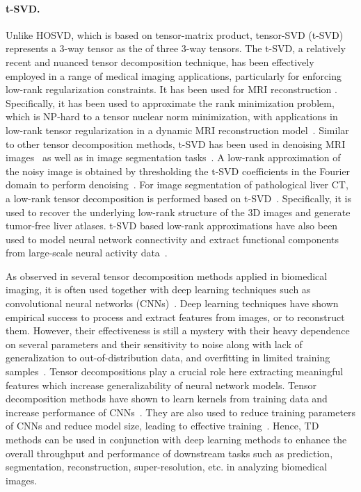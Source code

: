 \paragraph{t-SVD.}
    Unlike HOSVD, which is based on tensor-matrix product, tensor-SVD (t-SVD) represents a 3-way tensor as the  of three 3-way tensors. The t-SVD, a relatively recent and nuanced tensor decomposition technique, has been effectively employed in a range of medical imaging applications, particularly for enforcing low-rank regularization constraints. It has been used for MRI reconstruction \cite{jiang2020improved, liu2025dynamic, ai2018dynamic, liu2023low}. Specifically, it has been used to approximate the rank minimization problem, which is NP-hard to a tensor nuclear norm minimization, with applications in low-rank tensor regularization in a dynamic MRI reconstruction model~\cite{liu2025dynamic}. Similar to other tensor decomposition methods, t-SVD has been used in denoising MRI images~\cite{khaleel2018denoising, kong2017new, khaleel2018denoising2} as well as in image segmentation tasks~\cite{shi2021multi}. A low-rank approximation of the noisy image is obtained by thresholding the t-SVD coefficients in the Fourier domain to perform denoising~\cite{khaleel2018denoising2}. For image segmentation of pathological liver CT, a low-rank tensor decomposition is performed based on t-SVD~\cite{shi2021multi}. Specifically, it is used to recover the underlying low-rank structure of the 3D images and generate tumor-free liver atlases.  
    t-SVD based low-rank approximations have also been used to model neural network connectivity and extract functional components from large-scale neural activity data~\cite{williams2018unsupervised}. 


As observed in several tensor decomposition methods applied in biomedical imaging, it is often used together with deep learning techniques such as convolutional neural networks (CNNs)~\cite{yaman2019low,oymak2021learning, khan2022deep, li2023learned}. Deep learning techniques have shown empirical success to process and extract features from images, or to reconstruct them. However, their effectiveness is still a mystery with their heavy dependence on several parameters and their sensitivity to noise along with lack of generalization to out-of-distribution data, and overfitting in limited training samples~\cite{chen2023deep}. Tensor decompositions play a crucial role here extracting meaningful features which increase generalizability of neural network models. Tensor decomposition methods have shown to learn kernels from training data and increase performance of CNNs~\cite{oymak2021learning}. They are also used to reduce training parameters of CNNs and reduce model size, leading to effective training~\cite{liu2023tensor}. Hence, TD methods can be used in conjunction with deep learning methods to enhance the overall throughput and performance of downstream tasks such as prediction, segmentation, reconstruction, super-resolution, etc. in analyzing biomedical images. 

